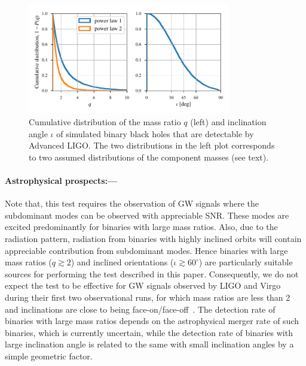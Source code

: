 \documentclass[prl,preprintnumbers,twocolumn,eqsecnum,floatfix,a4paper,nofootinbib,superscriptaddress]{revtex4}
\newcommand{\red}[1]{\textcolor{red}{#1}}
\begin{document}
% 


\begin{figure}[tbh]
	\includegraphics*[width=3.5in]{figs/q_and_iota_dist.pdf}
	\caption{Cumulative distribution of the mass ratio $q$ (left) and inclination angle $\iota$ of simulated binary black holes that are detectable by Advanced LIGO. The two distributions in the left plot corresponds to two assumed distributions of the component masses (see text).}
	\label{fig:q_iota_distribution}
\end{figure}


\paragraph{Astrophysical prospects:---}  Note that, this test requires the observation of GW signals where the subdominant modes can be observed with appreciable SNR. These modes are excited predominantly for binaries with large mass ratios. Also, due to the radiation pattern, radiation from binaries with highly inclined orbits will contain appreciable contribution from subdominant modes. Hence binaries with large mass ratios ($q \gtrsim 2$) and inclined orientations ($\iota \gtrsim 60^{\circ}$) are particularly suitable sources for performing the test described in this paper. Consequently, we do not expect the test to be effective for GW signals observed by LIGO and Virgo during their first two observational runs, for which mass ratios are less than 2 and inclinations are close to being face-on/face-off~\cite{LSC_2016O1results,gw170104,gw170814}. The detection rate of binaries with large mass ratios depends on the astrophysical merger rate of such binaries, which is currently uncertain, while the detection rate of binaries with large inclination angle is related to the same with small inclination angles by a simple geometric factor. 
\end{document}
